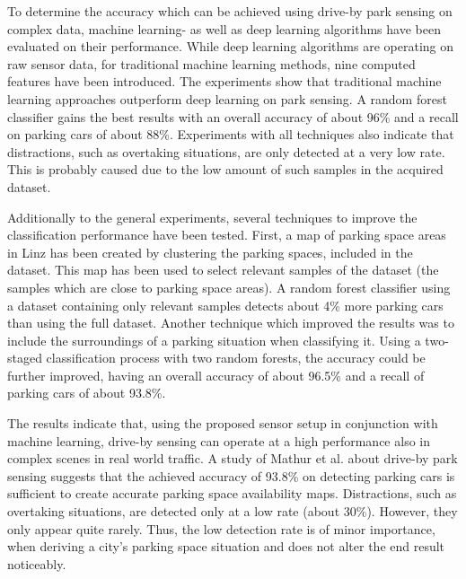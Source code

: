

To determine the accuracy which can be achieved using drive-by park sensing on complex data, machine learning- as well as deep learning algorithms have been evaluated on their performance. While deep learning algorithms are operating on raw sensor data, for traditional machine learning methods, nine computed features have been introduced. The experiments show that traditional machine learning approaches outperform deep learning on park sensing. A random forest classifier gains the best results with an overall accuracy of about 96\% and a recall on parking cars of about 88\%. Experiments with all techniques also indicate that distractions, such as overtaking situations, are only detected at a very low rate. This is probably caused due to the low amount of such samples in the acquired dataset. 

Additionally to the general experiments, several techniques to improve the classification performance have been tested. First, a map of parking space areas in Linz has been created by clustering the parking spaces, included in the dataset. This map has been used to select relevant samples of the dataset (the samples which are close to parking space areas). A random forest classifier using a dataset containing only relevant samples detects about 4\% more parking cars than using the full dataset. Another technique which improved the results was to include the surroundings of a parking situation when classifying it. Using a two-staged classification process with two random forests, the accuracy could be further improved, having an overall accuracy of about 96.5\% and a recall of parking cars of about 93.8\%.

The results indicate that, using the proposed sensor setup in conjunction with machine learning, drive-by sensing can operate at a high performance also in complex scenes in real world traffic. 
A study of Mathur et al. about drive-by park sensing \cite{Mathur:2010:PDS:1814433.1814448} suggests that the achieved accuracy of 93.8\% on detecting parking cars is sufficient to create accurate parking space availability maps.
Distractions, such as overtaking situations, are detected only at a low rate (about 30\%). However, they only appear quite rarely. Thus, the low detection rate is of minor importance, when deriving a city's parking space situation and does not alter the end result noticeably.

